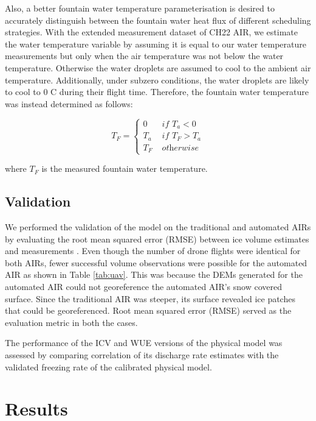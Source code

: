\documentclass[tc, manuscript]{copernicus}
\begin{document}
Also, a better fountain water temperature parameterisation is desired to accurately distinguish between the
fountain water heat flux of different scheduling strategies. With the extended measurement dataset of CH22 AIR,
we estimate the water temperature variable by assuming it is equal to our water temperature measurements but
only when the air temperature was not below the water temperature. Otherwise the water droplets are assumed to
cool to the ambient air temperature. Additionally, under subzero conditions, the water droplets are likely to
cool to 0 C during their flight time. Therefore, the fountain water temperature was instead determined as
follows:

\begin{equation}
	T_{F} = \left\{ \begin{array}{ll}
		0 & \textit{ if } T_{a} < 0 \\
		T_a & \textit{ if } T_{F} > T_a \\
		T_{F} & \textit{ otherwise}
	\end{array} \right.
\end{equation}

where $T_{F}$ is the measured fountain water temperature.


\subsection{Validation}

We performed the validation of the model on the traditional and automated AIRs by evaluating the root mean
squared error (RMSE) between ice volume estimates and measurements . Even though the number of drone flights
were identical for both AIRs, fewer successful volume observations were possible for the automated AIR as shown
in Table \ref{tab:uav}. This was because the DEMs generated for the automated AIR could not georeference the
automated AIR's snow covered surface. Since the traditional AIR was steeper, its surface revealed ice patches
that could be georeferenced. Root mean squared error (RMSE) served as the evaluation metric in both the cases.

The performance of the ICV and WUE versions of the physical model was assessed by comparing correlation of its
discharge rate estimates with the validated freezing rate of the calibrated physical model.

\section{Results}
\end{document}
